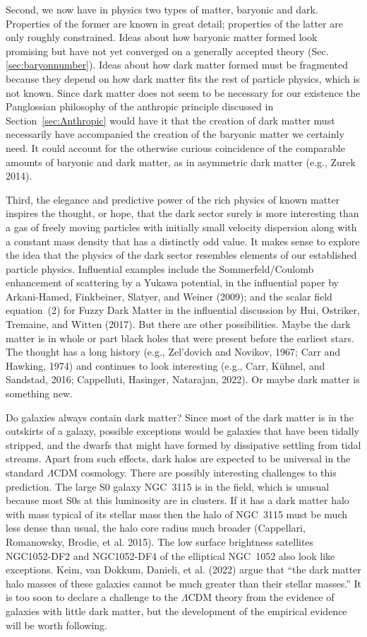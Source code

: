 \documentclass[fleqn,usenatbib]{mnras}
\begin{document}
Second, we now have in physics two types of matter, baryonic and dark. Properties of the former are known in great detail; properties of the latter are only roughly constrained. Ideas about how baryonic matter formed look promising but have not yet converged on a generally accepted theory (Sec.\ref{sec:baryonnumber}). Ideas about how dark matter formed must be fragmented because they depend on how dark matter fits the rest of particle physics, which is not known. Since dark matter does not seem to be necessary for our existence the Panglossian philosophy of the anthropic principle discussed in Section~\ref{sec:Anthropic} would have it that the creation of dark matter must necessarily have accompanied the creation of the baryonic matter we certainly need. It could account for the otherwise curious coincidence of the comparable amounts of baryonic and dark matter, as in asymmetric dark matter (e.g., Zurek 2014).

Third, the elegance and predictive power of the rich physics of known matter inspires the thought, or hope, that the dark sector surely is more interesting than a gas of freely moving particles with initially small velocity dispersion along with a constant mass density that has a distinctly odd value. It makes sense to explore the idea that the physics of the dark sector resembles elements of our established particle physics. Influential examples include the Sommerfeld/Coulomb enhancement of scattering by a Yukawa potential, in the influential paper by Arkani-Hamed, Finkbeiner, Slatyer, and Weiner (2009); and the scalar field equation~(2) for Fuzzy Dark Matter in the influential discussion by Hui, Ostriker, Tremaine, and Witten (2017). But there are other possibilities. Maybe the dark matter is in whole or part black holes that were present before the earliest stars. The thought has a long history (e.g., Zel'dovich and Novikov, 1967; Carr and Hawking, 1974) and continues to look interesting (e.g., Carr, K{\"u}hnel, and Sandstad, 2016; Cappelluti, Hasinger, Natarajan, 2022). Or maybe dark matter is something new. 

Do galaxies always contain dark matter? Since most of the dark matter is in the outskirts of a galaxy, possible exceptions would be galaxies that have been tidally stripped, and the dwarfs that might have formed by dissipative settling from tidal streams. Apart from such effects, dark halos are expected to be universal in the standard $\Lambda$CDM cosmology. There are possibly interesting challenges to this prediction. The large S0 galaxy NGC~3115 is in the field, which is unusual because most S0s at this luminosity are in clusters. If it has a dark matter halo with mass typical of its stellar mass then the halo of NGC~3115 must be much less dense than usual, the halo core radius much broader (Cappellari, Romanowsky, Brodie, et al. 2015). The low surface brightness satellites NGC1052-DF2 and NGC1052-DF4 of the elliptical NGC~1052 also look like exceptions. Keim, van Dokkum, Danieli, et al. (2022) argue that ``the dark matter halo masses of these galaxies cannot be much greater than their stellar masses.'' It is too soon to declare a challenge to the $\Lambda$CDM theory from the evidence of galaxies with little dark matter, but the development of the empirical evidence will be worth following. 
\end{document}
